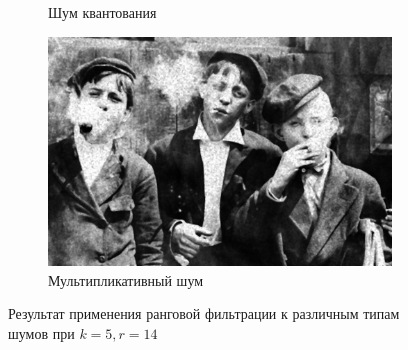 \begin{figure}[ht]
\begin{subfigure}[b]{0.5\linewidth}
      \caption{Шум квантования} 
      \label{rang_5_14:e}
    \end{subfigure}%
    \begin{subfigure}[b]{0.5\linewidth}
        \centering
        \includegraphics[width=0.95\linewidth]{../Rang_Filter/Rang_Speckle_noise_(k=5,r=14).jpg} 
        \caption{Мультипликативный шум} 
        \label{rang_5_14:f} 
    \end{subfigure} 
    \caption{Результат применения ранговой фильтрации к различным типам шумов при $k = 5, r = 14$}
    \label{img:rang_5_14} 
\end{figure}

